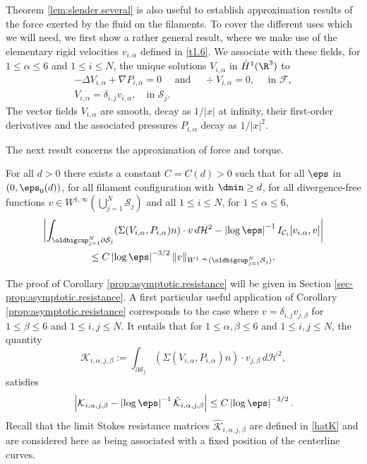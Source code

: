 Theorem \ref{lem:slender.several} is also useful to establish
approximation results of the force {exerted by the fluid on the filaments.}
To cover the different uses which we will need, we first show a rather general result, where we make use of the elementary rigid velocities $v_{i,\alpha}$ defined in \eqref{t1.6}. We associate with these fields, for $1 \leq \alpha\leq 6$ and $1 \leq i \leq N$, the unique solutions $ V_{i,\alpha}$ in $\dot H^1(\R^3)$ to
\begin{subequations}
\label{sti}
\begin{gather}
\label{sti1}
-\Delta V_{i,\alpha} + \nabla P_{i,\alpha} = 0 \quad \text{ and } \quad \div V_{i,\alpha} = 0, \quad \text{ in } \mathcal F,
\\ \label{sti3}
V_{i,\alpha} = \delta_{i,j} v_{i,\alpha}, \quad \text{in } \mathcal S_j.
\end{gather}
\end{subequations}
The vector fields $ V_{i,\alpha} $ are smooth, decay as $1/ \vert x \vert$ at infinity, their first-order derivatives and the associated pressures $P_{i,\alpha}$ decay as $1/ \vert x \vert^2$.

The next result concerns the approximation of force and torque.
\begin{cor} \label{prop:asymptotic.resistance}
For all $d > 0$ there exists a constant $C = C(d) > 0$ such that for all $\eps $ in $(0, \eps_0(d))$, for all filament configuration with $\dmin \geq d$, for all divergence-free functions $v \in W^{1,\infty}(\bigcup_{j=1}^N \mathcal S_j)$ and all $1 \leq i \leq N$, for $1 \leqslant \alpha \leqslant 6 $,
\begin{multline}
\biggl| \int_{\oldbigcup_{j=1}^N \partial \mathcal S_j} (\Sigma (V_{i,\alpha}, P_{i,\alpha}) n) \cdot v \, d\mathcal{H}^2 - \left|\log \eps\right|^{-1}
I_{\mathcal{C}_i } [v_{i,\alpha}, v]
\biggr| \\
\leq C \left|\log \eps\right|^{- 3/2} \|v\|_{W^{1,\infty}{(\oldbigcup_{j=1}^N \mathcal S_j)}}.
\label{eq:Faxen.force}
\end{multline}
\end{cor}
The proof of Corollary \ref{prop:asymptotic.resistance} will be given in Section \ref{sec-prop:asymptotic.resistance}.
A first particular useful application of Corollary \ref{prop:asymptotic.resistance} corresponds to the case where $v=\delta_{i,j}v_{j,\beta}$ for $1 \leq \beta \leq 6$ and $1 \leq i,j \leq N$. It entails that for $1 \leq \alpha,\beta \leq 6$ and $1 \leq i,j \leq N$, the quantity
\begin{equation} \label{resis}
\mathcal K_{i,\alpha,j,\beta} := \int_{\partial \mathcal S_j} (\Sigma (V_{i,\alpha}, P_{i,\alpha}) n) \cdot v_{j,\beta} \, d\mathcal{H}^2,
\end{equation}
satisfies
\begin{equation}
\left| \mathcal K_{i,\alpha,j,\beta} -
\left|\log \eps\right|^{-1} \hat{\mathcal K}_{i,\alpha,j,\beta}
\right| \leq C \left|\log \eps\right|^{-3/2}. \label{eq:approx.K}
\end{equation}
Recall that the limit Stokes resistance matrices $ \hat{\mathcal K}_{i,\alpha,j,\beta}$ are defined in \eqref{hatK} and are considered here as being associated with a fixed position of the centerline curves.

